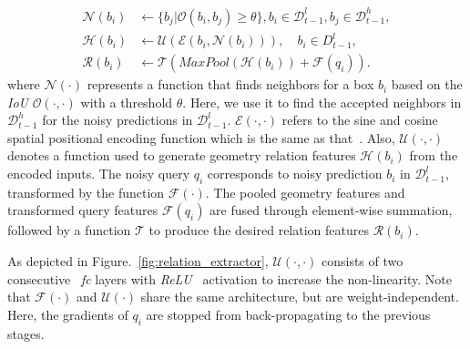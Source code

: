 \documentclass[final]{cvpr}
\begin{document}
\vspace{-5pt}
\begin{equation}
\begin{split}
    \mathcal{N}(b_i) &\gets \{b_j| \mathcal{O}(b_i, b_j) \geq \theta \},  b_i \in \mathcal{D}^l_{t-1}, b_j \in \mathcal{D}^h_{t-1}, \\
\mathcal{H}(b_i) &\gets \mathcal{U}(\mathcal{E}(b_i, \mathcal{N}(b_i))), \quad b_i \in {D}^l_{t-1}, \\
    \mathcal{R}(b_i) &\gets \mathcal{T}(\textit{MaxPool}(\mathcal{H}(b_i)) + \mathcal{F}(q_i)).
\end{split}\label{equ:connection}    
\end{equation}
where $\mathcal{N} (\cdot)$ represents a function that finds neighbors for a box $b_i$ based on the \textit{IoU} $\mathcal{O}(\cdot, \cdot)$ with a threshold $\theta$. Here, we use it to find the accepted neighbors in $\mathcal{D}^{h}_{t-1}$ for the noisy predictions in $\mathcal{D}^l_{t-1}$. $\mathcal{E}(\cdot, \cdot)$ refers to the sine and cosine spatial positional encoding function which is the same as that~\cite{hu2018relation, attnyouneed}. Also, $\mathcal{U}(\cdot, \cdot)$ denotes a function used to generate geometry relation features $\mathcal{H}(b_i)$ from the encoded inputs. The noisy query $q_i$ corresponds to noisy prediction $b_i$ in $\mathcal{D}^l_{t-1}$, transformed by the function $\mathcal{F}(\cdot)$. The pooled geometry features and transformed query features $\mathcal{F}(q_i)$ are fused through element-wise summation, followed by a function $\mathcal{T}$ to produce the desired relation features $\mathcal{R}(b_i)$.

As depicted in Figure.~\ref{fig:relation_extractor}, $\mathcal{U}(\cdot, \cdot)$ consists of two consecutive ~\textit{fc} layers with \textit{ReLU}~\cite{maas2013rectifier} activation to increase the  non-linearity. Note that $\mathcal{F}(\cdot)$ and $\mathcal{U}(\cdot)$ share the same architecture, but are weight-independent. Here, the gradients of $q_i$ are stopped from back-propagating to the previous stages.
\end{document}
